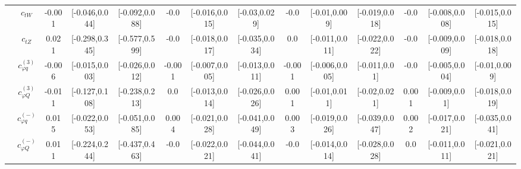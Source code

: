 \documentclass{article}
\begin{document}
\begin{table}[H]
\begin{tabular}{|c|c|c|c|c|c|c|c|c|c|c|c|c|c|}
 & $c_{tW}$ & -0.001                             & [-0.046,0.044]                                 & [-0.092,0.088] & -0.0                             & [-0.016,0.015]                                 & [-0.03,0.029] & -0.0                             & [-0.01,0.009]                                 & [-0.019,0.018] & -0.0                             & [-0.008,0.008]                                 & [-0.015,0.015] \\ \cline{2-14}
 & $c_{tZ}$ & 0.021                             & [-0.298,0.345]                                 & [-0.577,0.599] & -0.0                             & [-0.018,0.017]                                 & [-0.035,0.034] & 0.0                             & [-0.011,0.011]                                 & [-0.022,0.022] & -0.0                             & [-0.009,0.009]                                 & [-0.018,0.018] \\ \cline{2-14}
 & $c_{\varphi q}^{(3)}$ & -0.006                             & [-0.015,0.003]                                 & [-0.026,0.012] & -0.001                             & [-0.007,0.005]                                 & [-0.013,0.011] & -0.001                             & [-0.006,0.005]                                 & [-0.011,0.01] & -0.0                             & [-0.005,0.004]                                 & [-0.01,0.009] \\ \cline{2-14}
 & $c_{\varphi Q}^{(3)}$ & -0.011                             & [-0.127,0.108]                                 & [-0.238,0.213] & 0.0                             & [-0.013,0.014]                                 & [-0.026,0.026] & 0.001                             & [-0.01,0.011]                                 & [-0.02,0.021] & 0.001                             & [-0.009,0.01]                                 & [-0.018,0.019] \\ \cline{2-14}
 & $c_{\varphi q}^{(-)}$ & 0.015                             & [-0.022,0.053]                                 & [-0.051,0.085] & 0.004                             & [-0.021,0.028]                                 & [-0.041,0.049] & 0.003                             & [-0.019,0.026]                                 & [-0.039,0.047] & 0.002                             & [-0.017,0.021]                                 & [-0.035,0.041] \\ \cline{2-14}
 & $c_{\varphi Q}^{(-)}$ & 0.011                             & [-0.224,0.244]                                 & [-0.437,0.463] & -0.0                             & [-0.022,0.021]                                 & [-0.044,0.041] & -0.0                             & [-0.014,0.014]                                 & [-0.028,0.028] & 0.0                             & [-0.011,0.011]                                 & [-0.021,0.021] \\ \cline{2-14}

\end{tabular}
\end{table}
\end{document}

